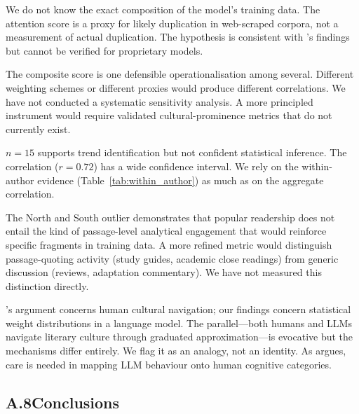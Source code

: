 \begin{description}[leftmargin=1.5em, labelindent=0em]

\item[Training data opacity.]  We do not know the exact composition of
the model's training data.  The attention score is a proxy for likely
duplication in web-scraped corpora, not a measurement of actual
duplication.  The hypothesis is consistent with
\textcite{carlini2023quantifying}'s findings but cannot be verified
for proprietary models.

\item[Ad hoc scoring.]  The composite score is one defensible
operationalisation among several.  Different weighting schemes or
different proxies would produce different correlations.  We have not
conducted a systematic sensitivity analysis.  A more principled
instrument would require validated cultural-prominence metrics that do
not currently exist.

\item[Small sample.]  $n = 15$ supports trend identification but not
confident statistical inference.  The correlation ($r = 0.72$) has a
wide confidence interval.  We rely on the within-author evidence
(Table~\ref{tab:within_author}) as much as on the aggregate
correlation.

\item[Readership vs.\ analytical engagement.]  The North and South
outlier demonstrates that popular readership does not entail the kind
of passage-level analytical engagement that would reinforce specific
fragments in training data.  A more refined metric would distinguish
passage-quoting activity (study guides, academic close readings) from
generic discussion (reviews, adaptation commentary).  We have not
measured this distinction directly.

\item[The Bayard parallel is a metaphor.]
\textcite{bayard2007comment}'s argument concerns human cultural
navigation; our findings concern statistical weight distributions in a
language model.  The parallel---both humans and LLMs navigate literary
culture through graduated approximation---is evocative but the
mechanisms differ entirely.  We flag it as an analogy, not an identity.
As \textcite{shanahan2024talking} argues, care is needed in mapping
LLM behaviour onto human cognitive categories.

\end{description}

\subsection*{A.8\quad Conclusions}

